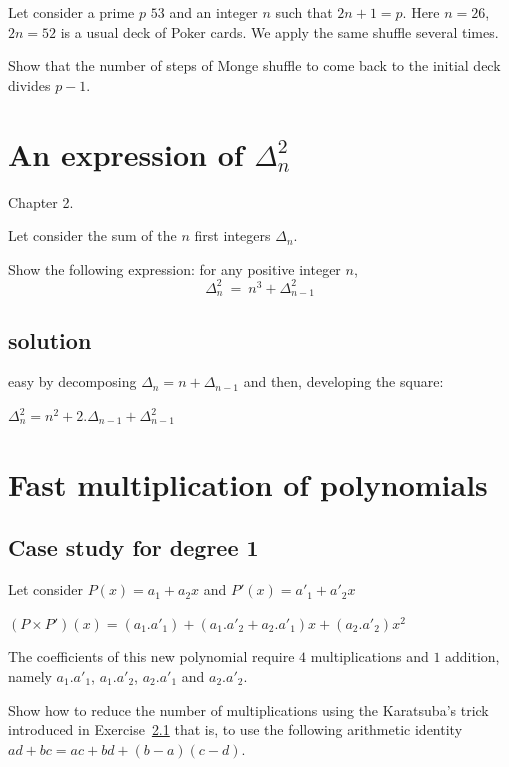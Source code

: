 \documentclass{article}[12pt]
\begin{document}
Let consider a prime $p$ $53$ and an integer $n$ such that $2n+1=p$.
Here $n=26$, $2n=52$ is a usual deck of Poker cards. 
We apply the same shuffle several times.

Show that the number of steps of Monge shuffle to come back to the initial deck divides $p-1$. 



\section{An expression of $\Delta_n^2$}

Chapter 2.

Let consider the sum of the $n$ first integers $\Delta_n$.

Show the following expression:
for any positive integer $n$,
\[ \Delta_{n}^2 \ = \ n^3 + \Delta_{n-1}^2 \]

\subsection{solution}

easy by decomposing $\Delta_{n} = n + \Delta_{n-1}$
and then, developing the square:

 $\Delta_{n}^2 = n^2 + 2.\Delta_{n-1} + \Delta_{n-1}^2$



\section{Fast multiplication of polynomials}


\subsection{Case study for degree 1}

Let consider $P(x) = a_1 + a_2 x $ and $P'(x) = a'_1 + a'_2 x $

$(P \times P')(x) = (a_1.a'_1) + (a_1.a'_2 + a_2.a'_1) x + (a_2.a'_2) x^2$

The coefficients of this new polynomial require $4$ multiplications and $1$ addition, 
namely $a_1.a'_1$, $a_1.a'_2$, $a_2.a'_1$ and $a_2.a'_2$.
\bigskip

Show how to reduce the number of multiplications using the Karatsuba's trick 
introduced in Exercise~\ref{} that is, 
to use the following arithmetic identity $ad+bc = ac + bd + (b-a)(c-d)$.
\end{document}
